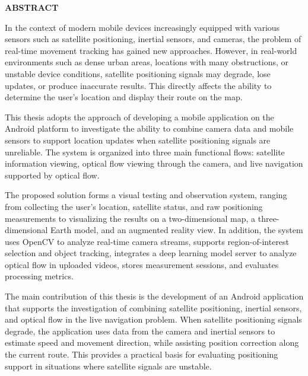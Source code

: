 \documentclass[../DoAn.tex]{subfiles}
\begin{document}
\begin{center}
    \Large{\textbf{ABSTRACT}}\\
\end{center}
\vspace{1cm}

In the context of modern mobile devices increasingly equipped with various sensors such as satellite positioning, inertial sensors, and cameras, the problem of real-time movement tracking has gained new approaches. However, in real-world environments such as dense urban areas, locations with many obstructions, or unstable device conditions, satellite positioning signals may degrade, lose updates, or produce inaccurate results. This directly affects the ability to determine the user’s location and display their route on the map.

This thesis adopts the approach of developing a mobile application on the Android platform to investigate the ability to combine camera data and mobile sensors to support location updates when satellite positioning signals are unreliable. The system is organized into three main functional flows: satellite information viewing, optical flow viewing through the camera, and live navigation supported by optical flow.

The proposed solution forms a visual testing and observation system, ranging from collecting the user’s location, satellite status, and raw positioning measurements to visualizing the results on a two-dimensional map, a three-dimensional Earth model, and an augmented reality view. In addition, the system uses OpenCV to analyze real-time camera streams, supports region-of-interest selection and object tracking, integrates a deep learning model server to analyze optical flow in uploaded videos, stores measurement sessions, and evaluates processing metrics.

The main contribution of this thesis is the development of an Android application that supports the investigation of combining satellite positioning, inertial sensors, and optical flow in the live navigation problem. When satellite positioning signals degrade, the application uses data from the camera and inertial sensors to estimate speed and movement direction, while assisting position correction along the current route. This provides a practical basis for evaluating positioning support in situations where satellite signals are unstable.
\end{document}
